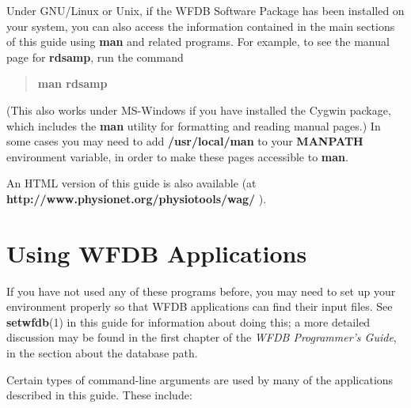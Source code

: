 \documentclass[twoside]{book}
\begin{document}
Under GNU/Linux or Unix, if the WFDB Software Package has been installed
on your system, you can also access the information contained in the
main sections of this guide using \textbf{man} and related programs.  For
example, to see the manual page for \textbf{rdsamp}, run the command
\begin{quote}
	\textbf{man rdsamp}
\end{quote}
(This also works under MS-Windows if you have installed the
Cygwin package, which includes the \textbf{man} utility for formatting
and reading manual pages.)  In some cases you may need to add
\textbf{/usr/local/man} to your \textbf{MANPATH} environment variable, in
order to make these pages accessible to \textbf{man}.

An HTML version of this guide is also available (at
\textbf{http://www.physionet.org/physiotools/wag/} ).

\section*{Using WFDB Applications}

If you have not used any of these programs before, you may need to set up
your environment properly so that WFDB applications can find their
input files.  See \textbf{setwfdb}(1) in this guide for information about
doing this; a more detailed discussion may be found in the first chapter
of the \textit{WFDB Programmer's Guide}, in the section about the database
path.

Certain types of command-line arguments are used by many of the applications
described in this guide.  These include:
\end{document}
